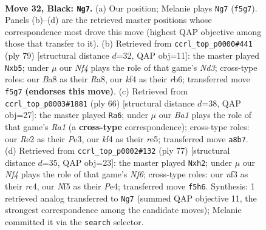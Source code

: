 \documentclass[11pt]{article}
\begin{document}
\clearpage

\begin{figure}[p]\centering
\begin{subfigure}{0.46\textwidth}\centering
\resizebox{\linewidth}{!}{%
\newchessgame
\chessboard[
  setfen={b3k3/P4p2/R5p1/4Pn2/5K2/5N1P/4r3/3N4 b - - 0 32},
  showmover=false,
  pgfstyle=straightmove, color=movearrow, markmove={f5-g7}
]}
\caption{}
\end{subfigure}\hfill
\begin{subfigure}{0.46\textwidth}\centering
\resizebox{\linewidth}{!}{%
\newchessgame
\chessboard[
  setfen={r7/3k3p/1R1n2p1/1N6/2p5/2P2P2/P5P1/6K1 b - - 2 40},
  showmover=false,
  pgfstyle=straightmove, color=movearrow, markmove={d6-b5}
]}
\caption{}
\end{subfigure}
\\[4pt]
\begin{subfigure}{0.46\textwidth}\centering
\resizebox{\linewidth}{!}{%
\newchessgame
\chessboard[
  setfen={8/6p1/2n1p1k1/4r1N1/1p5P/4P3/5KP1/R7 w - - 0 34},
  showmover=false,
  pgfstyle=straightmove, color=movearrow, markmove={a1-a6}
]}
\caption{}
\end{subfigure}\hfill
\begin{subfigure}{0.46\textwidth}\centering
\resizebox{\linewidth}{!}{%
\newchessgame
\chessboard[
  setfen={r7/7p/3k4/5p2/P1R1p3/1N2Kn2/P4P1P/8 b - - 0 39},
  showmover=false,
  pgfstyle=straightmove, color=movearrow, markmove={f3-h2}
]}
\caption{}
\end{subfigure}
\caption{\textbf{Move 32, Black: \texttt{Ng7}.} (a) Our position; Melanie plays \texttt{Ng7} (\texttt{f5g7}). Panels (b)--(d) are the retrieved master positions whose correspondence most drove this move (highest QAP objective among those that transfer to it). (b) Retrieved from \texttt{ccrl\_top\_p0000\#441} (ply 79) [structural distance $d$=32, QAP obj=11]: the master played \texttt{Nxb5}; under $\mu$ our \emph{Nf4} plays the role of that game's \emph{Nd3}; cross-type roles: our \emph{B}a8 as their \emph{R}a8, our \emph{k}f4 as their \emph{r}b6; transferred move \texttt{f5g7} \textbf{(endorses this move)}. (c) Retrieved from \texttt{ccrl\_top\_p0003\#1881} (ply 66) [structural distance $d$=38, QAP obj=27]: the master played \texttt{Ra6}; under $\mu$ our \emph{Ba1} plays the role of that game's \emph{Ra1} (a \textbf{cross-type} correspondence); cross-type roles: our \emph{R}e2 as their \emph{P}e3, our \emph{k}f4 as their \emph{r}e5; transferred move \texttt{a8b7}. (d) Retrieved from \texttt{ccrl\_top\_p0002\#132} (ply 77) [structural distance $d$=35, QAP obj=23]: the master played \texttt{Nxh2}; under $\mu$ our \emph{Nf4} plays the role of that game's \emph{Nf6}; cross-type roles: our \emph{n}f3 as their \emph{r}c4, our \emph{N}f5 as their \emph{P}e4; transferred move \texttt{f5h6}. Synthesis: 1 retrieved analog transferred to \texttt{Ng7} (summed QAP objective 11, the strongest correspondence among the candidate moves); Melanie committed it via the \texttt{search} selector.}
\label{fig:thought-m63}
\end{figure}
\end{document}
